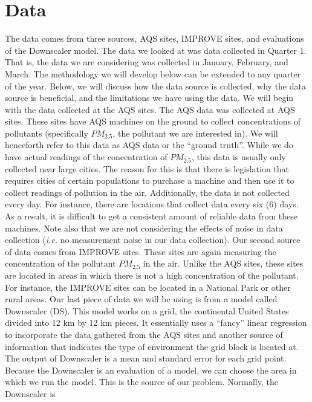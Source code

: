\documentclass[10pt]{article}
\theoremstyle{plain}
\theoremstyle{definition}
\theoremstyle{remark}
\begin{document}
\section{Data}
\justify
The data comes from three sources, AQS sites, IMPROVE sites, and evaluations of the Downscaler model.  The data we looked at was data collected in Quarter 1.  That is, the data we are considering was collected in January, February, and March.  The methodology we will develop below can be extended to any quarter of the year.  Below, we will discuss how the data source is collected, why the data source is beneficial, and the limitations we have using the data.  We will begin with the data collected at the AQS sites. 
\justify
The AQS data was collected at AQS sites.  These sites have AQS machines on the ground to collect concentrations of pollutants (specifically $PM_{2.5}$, the pollutant we are interested in).  We will henceforth refer to this data as AQS data  or the ``ground truth''.  While we do have actual readings of the concentration of $PM_{2.5}$, this data is usually only collected near large cities.  The reason for this is that there is legislation that requires cities of certain populations to purchase a machine and then use it to collect readings of pollution in the air.  Additionally, the data is not collected every day.  For instance, there are locations that collect data every six (6) days.  As a result, it is difficult to get a consistent amount of reliable data from these machines.  Note also that we are not considering the effects of noise in data collection (\textit{i.e.} no measurement noise in our data collection).
\justify
Our second source of data comes from IMPROVE sites.  These sites are again measuring the concentration of the pollutant $PM_{2.5}$ in the air.  Unlike the AQS sites, these sites are located in areas in which there is not a high concentration of the pollutant.  For instance, the IMPROVE sites can be located in a National Park or other rural areas.
\justify
Our last piece of data we will be using is from a model called Downscaler (DS).  This model works on a grid, the continental United States divided into 12 km by 12 km pieces.  It essentially uses a ``fancy'' linear regression to incorporate the data gathered from the AQS sites and another source of information that indicates the type of environment the grid block is located at.  The output of Downscaler is a mean and standard error for each grid point.  Because the Downscaler is an evaluation of a model, we can choose the area in which we run the model. This is the source of our problem.  Normally, the Downscaler is 
\end{document}
